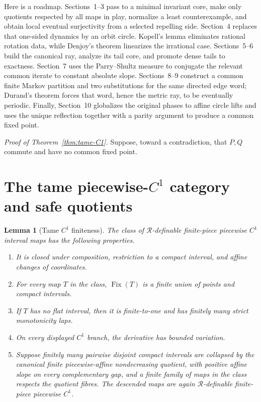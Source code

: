 \documentclass[11pt]{article}
\newtheorem{lemma}[theorem]{Lemma}
\theoremstyle{definition}
\theoremstyle{remark}
\newcommand{\Fix}{\operatorname{Fix}}
\begin{document}
Here is a roadmap.  Sections~1--3 pass to a minimal invariant core, make only
quotients respected by all maps in play, normalize a least counterexample,
and obtain local eventual surjectivity from a selected repelling side.
Section~4 replaces that one-sided dynamics by an orbit circle.  Kopell's
lemma eliminates rational rotation data, while Denjoy's theorem linearizes
the irrational case.  Sections~5--6 build the canonical ray, analyze its
tail core, and promote dense tails to exactness.  Section~7 uses the
Parry--Shultz measure to conjugate the relevant common iterate to constant
absolute slope.  Sections~8--9 construct a common finite Markov partition
and two substitutions for the same directed edge word; Durand's theorem
forces that word, hence the metric ray, to be eventually periodic.  Finally,
Section~10 globalizes the original phases to affine circle lifts and uses the
unique reflection together with a parity argument to produce a common fixed
point.

\par\noindent\textit{Proof of Theorem~\ref{thm:tame-C1}.}\quad
Suppose, toward a contradiction, that \(P,Q\) commute and have no common
fixed point.

\section{The tame piecewise-\texorpdfstring{\(C^1\)}{C1} category and safe quotients}

\begin{lemma}[Tame \(C^1\) finiteness]\label{lem:analytic-finiteness}
The class of \(\mathcal R\)-definable finite-piece piecewise \(C^1\) interval
maps has the
following properties.
\begin{enumerate}
\item It is closed under composition, restriction to a compact interval, and
affine changes of coordinates.
\item For every map \(T\) in the class, \(\Fix(T)\) is a finite union of
points and compact intervals.
\item If \(T\) has no flat interval, then it is finite-to-one and has finitely
many strict monotonicity laps.
\item On every displayed \(C^1\) branch, the derivative has bounded
variation.
\item Suppose finitely many pairwise disjoint compact intervals are collapsed
by the canonical finite piecewise-affine nondecreasing quotient, with positive
affine slope on every complementary gap, and a finite family of maps in the
class respects the quotient fibres.  The descended maps are again
\(\mathcal R\)-definable finite-piece piecewise \(C^1\).
\end{enumerate}
\end{lemma}
\end{document}
